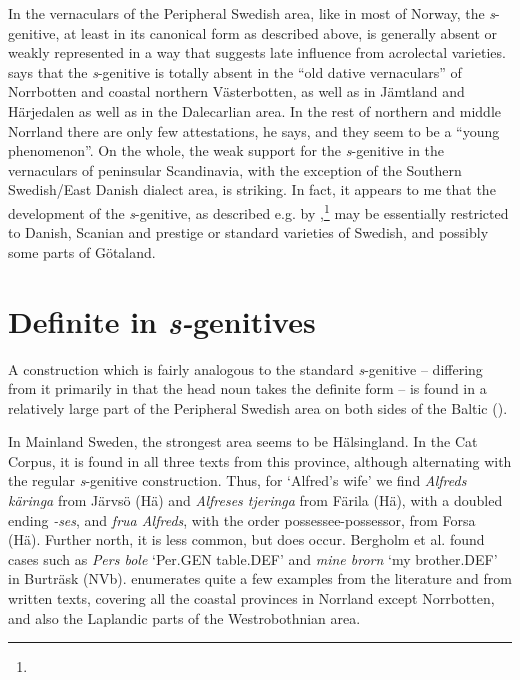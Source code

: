 \begin{styleBodytextC}
In the vernaculars of the Peripheral Swedish area, like in most of Norway, the \textit{s}{}-genitive, at least in its canonical form as described above, is generally absent or weakly represented in a way that suggests late influence from acrolectal varieties. \citet[41]{Delsing2003a} says that the \textit{s}{}-genitive is totally absent in the “old dative vernaculars” of Norrbotten and coastal northern Västerbotten, as well as in Jämtland and Härjedalen as well as in the Dalecarlian area. In the rest of northern and middle Norrland there are only few attestations, he says, and they seem to be a “young phenomenon”. On the whole, the weak support for the \textit{s}{}-genitive in the vernaculars of peninsular Scandinavia, with the exception of the Southern Swedish/East Danish dialect area, is striking. In fact, it appears to me that the development of the \textit{s}{}-genitive, as described e.g. by \citet{Norde1997},\footnote{} may be essentially restricted to Danish, Scanian and prestige or standard varieties of Swedish, and possibly some parts of Götaland. 

\end{styleBodytextC}

\section{Definite in \textit{s-}genitives}
\label{bkm:Ref137614892}
\begin{styleBodyTextFirst}
A construction which is fairly analogous to the standard \textit{s}{}-genitive – differing from it primarily in that the head noun takes the definite form – is found in a relatively large part of the Peripheral Swedish area on both sides of the Baltic (\citet[27]{Delsing2003a}).

\end{styleBodyTextFirst}

\begin{styleBodytextC}
In Mainland Sweden, the strongest area seems to be Hälsingland. In the Cat Corpus, it is found in all three texts from this province, although alternating with the regular \textit{s}{}-genitive construction. Thus, for ‘Alfred’s wife’ we find \textit{Alfreds käringa} from Järvsö (Hä) and \textit{Alfreses tjeringa} from Färila (Hä), with a doubled ending\textit{ -ses}, and \textit{frua Alfreds}, with the order possessee-possessor, from Forsa (Hä). Further north, it is less common, but does occur.  Bergholm et al. found cases such as \textit{Pers bole }‘Per.GEN table.DEF’ and \textit{mine brorn} ‘my brother.DEF’ in Burträsk (NVb). \citet[27]{Delsing2003a} enumerates quite a few examples from the literature and from written texts, covering all the coastal provinces in Norrland except Norrbotten, and also the Laplandic parts of the Westrobothnian area. 

\end{styleBodytextC}

